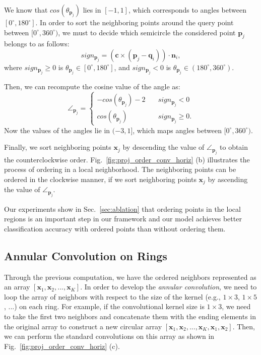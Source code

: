 \documentclass[10pt,twocolumn,letterpaper]{article}
\begin{document}
We know that $cos(\theta_{\mathbf{p}_{j}})$ lies in $[-1,1]$, which corresponds to angles between $[0^{\circ}, 180^{\circ}]$. In order to sort the neighboring points around the query point between $[0^{\circ}, 360^{\circ})$, we must to decide which semicircle the considered point $\mathbf{p}_{j}$ belongs to as follows:
\begin{equation}
sign_{\mathbf{p}_j} = (\mathbf{c}\times (\mathbf{p}_j - \mathbf{q}_i))\cdot \mathbf{n}_i,
\end{equation}
where $sign_{\mathbf{p}_j} \geq 0$ is $\theta_{\mathbf{p}_{j}} \in [0^{\circ}, 180^{\circ}]$, and $sign_{\mathbf{p}_j} < 0$ is $\theta_{\mathbf{p}_{j}} \in (180^{\circ}, 360^{\circ})$.

Then, we can recompute the cosine value of the angle as:
\begin{equation}
\angle_{\mathbf{p}_{j}} = \left\{
        \begin{array}{ll}
            - cos(\theta_{\mathbf{p}_{j}}) - 2 & \quad sign_{\mathbf{p}_j} < 0 \\
            cos(\theta_{\mathbf{p}_{j}}) & \quad sign_{\mathbf{p}_j} \geq 0.
        \end{array}
    \right.
\end{equation}
Now the values of the angles lie in $(-3, 1]$, which maps angles between $[0^{\circ}, 360^{\circ})$.

Finally, we sort neighboring points $\mathbf{x}_{j}$ by descending the value of $\angle_{\mathbf{p}_{j}}$ to obtain the counterclockwise order. Fig.~\ref{fig:proj_order_conv_horiz} (b) illustrates the process of ordering in a local neighborhood. The neighboring points can be ordered in the clockwise manner, if we sort neighboring points $\mathbf{x}_{j}$ by ascending the value of $\angle_{\mathbf{p}_{j}}$.

Our experiments show in Sec.~\ref{sec:ablation} that ordering points in the local regions is an important step in our framework and our model achieves better classification accuracy with ordered points than without ordering them.

\subsection{Annular Convolution on Rings}
\label{sec:annular_conv}
Through the previous computation, we have the ordered neighbors represented as an array $[\mathbf{x}_{1}, \mathbf{x}_{2}, ... , \mathbf{x}_{K}]$. In order to develop the \emph{annular convolution}, we need to loop the array of neighbors with respect to the size of the kernel (e.g., $1\times3$, $1\times5$, ...) on each ring. For example, if the convolutional kernel size is $1\times3$, we need to take the first two neighbors and concatenate them with the ending elements in the original array to construct a new circular array $[\mathbf{x}_{1}, \mathbf{x}_{2}, ... , \mathbf{x}_{K}, \mathbf{x}_{1}, \mathbf{x}_{2}]$. Then, we can perform the standard convolutions on this array as shown in Fig.~\ref{fig:proj_order_conv_horiz} (c).
\end{document}
